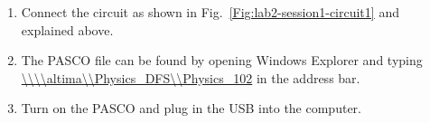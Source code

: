 \documentclass[12pt]{report}
\begin{document}
\begin{enumerate}
\item Connect the circuit as shown in Fig.~\ref{Fig:lab2-session1-circuit1} and explained above.
\item The PASCO file can be found by opening Windows Explorer and typing \url{\\\\altima\\Physics_DFS\\Physics_102} in the address bar.
\item Turn on the PASCO and plug in the USB into the computer.


\end{enumerate}
\end{document}
